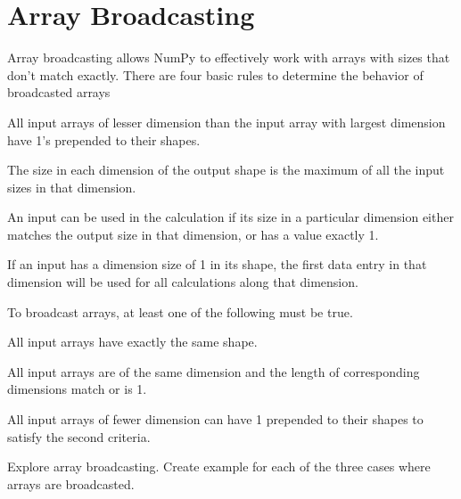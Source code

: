 \section*{Array Broadcasting}
Array broadcasting allows NumPy to effectively work with arrays with sizes that don't match exactly.  There are four basic rules to determine the behavior of broadcasted arrays

\begin{remunerate}
\item All input arrays of lesser dimension than the input array with largest dimension have 1's prepended to their shapes.
\item The size in each dimension of the output shape is the maximum of all the input sizes in that dimension.
\item An input can be used in the calculation if its size in a particular dimension either matches the output size in that dimension, or has a value exactly 1.
\item If an input has a dimension size of 1 in its shape, the first data entry in that dimension will be used for all calculations along that dimension.
\end{remunerate}

To broadcast arrays, at least one of the following must be true.
\begin{remunerate}
\item All input arrays have exactly the same shape.
\item All input arrays are of the same dimension and the length of corresponding dimensions match or is 1.
\item All input arrays of fewer dimension can have 1 prepended to their shapes to satisfy the second criteria.
\end{remunerate}

\begin{problem}
Explore array broadcasting.  Create example for each of the three cases where arrays are broadcasted.
\end{problem}